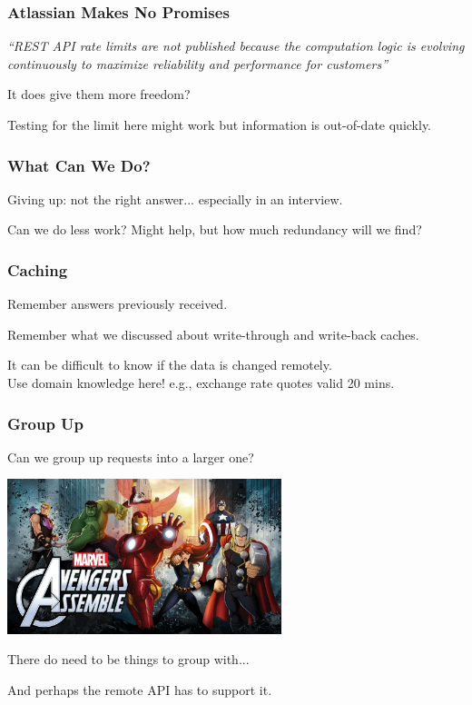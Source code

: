 \begin{frame}
\frametitle{Atlassian Makes No Promises}

\textit{``REST API rate limits are not published because the computation logic is evolving continuously to maximize reliability and performance for customers'' }

It does give them more freedom?

Testing for the limit here might work but information is out-of-date quickly.

\end{frame}

\begin{frame}
\frametitle{What Can We Do?}

Giving up: not the right answer... especially in an interview.

Can we do less work? Might help, but how much redundancy will we find?

\end{frame}

\begin{frame}
\frametitle{Caching}

Remember answers previously received. 

Remember what we discussed about write-through and write-back caches.

It can be difficult to know if the data is changed remotely.\\
\quad Use domain knowledge here! e.g., exchange rate quotes valid 20 mins.

\end{frame}

\begin{frame}
\frametitle{Group Up}

Can we group up requests into a larger one?

\begin{center}
  \includegraphics[width=0.6\textwidth]{images/assemble.jpg}
\end{center}

There do need to be things to group with...

And perhaps the remote API has to support it.

\end{frame}

